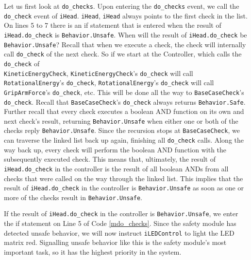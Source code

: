 \documentclass[12pt]{scrreprt}
\begin{document}
Let us first look at \texttt{do\_checks}. Upon entering the \texttt{do\_checks} event, we call the \texttt{do\_check} event of \texttt{iHead}. \texttt{iHead}, \texttt{iHead} always points to the first check in the list. On lines 5 to 7 there is an if statement that is entered when the result of \texttt{iHead.do\_check} is \texttt{Behavior.Unsafe}. When will the result of \texttt{iHead.do\_check} be \texttt{Behavior.Unsafe}? Recall that when we execute a check, the check will internally call \texttt{do\_check} of the next check. So if we start at the Controller, which calls the \texttt{do\_check} of\\\texttt{KineticEnergyCheck}, \texttt{KineticEnergyCheck}'s \texttt{do\_check} will call \texttt{RotationalEnergy}'s \texttt{do\_check}, \texttt{RotationalEnergy}'s \texttt{do\_check} will call \texttt{GripArmForce}'s \texttt{do\_check}, etc. This will be done all the way to \texttt{BaseCaseCheck}'s \texttt{do\_check}. Recall that \texttt{BaseCaseCheck}'s \texttt{do\_check} always returns \texttt{Behavior.Safe}. Further recall that every check executes a boolean AND function on its own and next check's result, returning \texttt{Behavior.Unsafe} when either one or both of the checks reply \texttt{Behavior.Unsafe}. Since the recursion stops at \texttt{BaseCaseCheck}, we can traverse the linked list back up again, finishing all \texttt{do\_check} calls. Along the way back up, every check will perform the boolean AND function with the subsequently executed check. This means that, ultimately, the result of \texttt{iHead.do\_check} in the controller is the result of all boolean ANDs from all checks that were called on the way through the linked list. This implies that the result of \texttt{iHead.do\_check} in the controller is \texttt{Behavior.Unsafe} as soon as one or more of the checks result in \texttt{Behavior.Unsafe}.
\par
If the result of \texttt{iHead.do\_check} in the controller is \texttt{Behavior.Unsafe}, we enter the if statement on Line 5 of Code \ref{mdo_checks}. Since the safety module has detected unsafe behavior, we will now instruct \texttt{iLEDControl} to light the LED matrix red. Signalling unsafe behavior like this is the safety module's most important task, so it has the highest priority in the system.
\par
\end{document}
